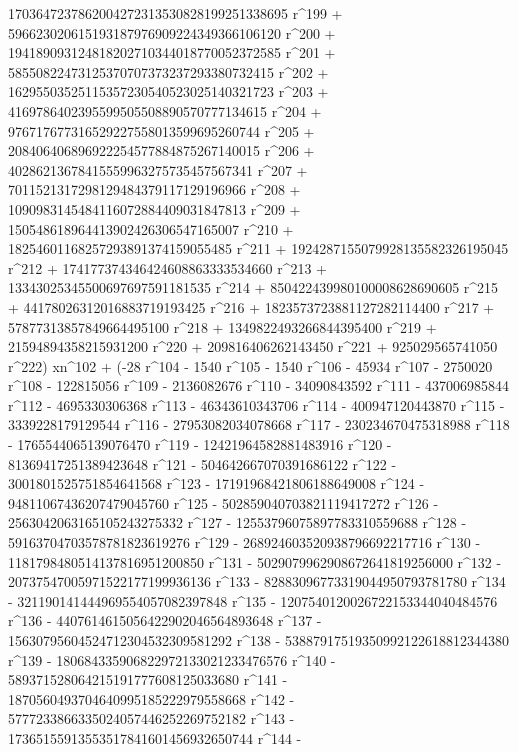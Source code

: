        1703647237862004272313530828199251338695 r^199 + 
       596623020615193187976909224349366106120 r^200 + 
       194189093124818202710344018770052372585 r^201 + 
       58550822473125370707373237293380732415 r^202 + 
       16295503525115357230540523025140321723 r^203 + 
       4169786402395599505508890570777134615 r^204 + 
       976717677316529227558013599695260744 r^205 + 
       208406406896922254577884875267140015 r^206 + 
       40286213678415559963275735457567341 r^207 + 
       7011521317298129484379117129196966 r^208 + 
       1090983145484116072884409031847813 r^209 + 
       150548618964413902426306547165007 r^210 + 
       18254601168257293891374159055485 r^211 + 
       1924287155079928135582326195045 r^212 + 
       174177374346424608863333534660 r^213 + 
       13343025345500697697591181535 r^214 + 
       850422439980100008628690605 r^215 + 
       44178026312016883719193425 r^216 + 
       1823573723881127282114400 r^217 + 
       57877313857849664495100 r^218 + 1349822493266844395400 r^219 + 
       21594894358215931200 r^220 + 209816406262143450 r^221 + 
       925029565741050 r^222) xn^102 + (-28 r^104 - 1540 r^105 - 
       1540 r^106 - 45934 r^107 - 2750020 r^108 - 122815056 r^109 - 
       2136082676 r^110 - 34090843592 r^111 - 437006985844 r^112 - 
       4695330306368 r^113 - 46343610343706 r^114 - 
       400947120443870 r^115 - 3339228179129544 r^116 - 
       27953082034078668 r^117 - 230234670475318988 r^118 - 
       1765544065139076470 r^119 - 12421964582881483916 r^120 - 
       81369417251389423648 r^121 - 504642667070391686122 r^122 - 
       3001801525751854641568 r^123 - 17191968421806188649008 r^124 - 
       94811067436207479045760 r^125 - 
       502859040703821119417272 r^126 - 
       2563042063165105243275332 r^127 - 
       12553796075897783310559688 r^128 - 
       59163704703578781823619276 r^129 - 
       268924603520938796692217716 r^130 - 
       1181798480514137816951200850 r^131 - 
       5029079962908672641819256000 r^132 - 
       20737547005971522177199936136 r^133 - 
       82883096773319044950793781780 r^134 - 
       321190141444969554057082397848 r^135 - 
       1207540120026722153344040484576 r^136 - 
       4407614615056422902046564893648 r^137 - 
       15630795604524712304532309581292 r^138 - 
       53887917519350992122618812344380 r^139 - 
       180684335906822972133021233476576 r^140 - 
       589371528064215191777608125033680 r^141 - 
       1870560493704640995185222979558668 r^142 - 
       5777233866335024057446252269752182 r^143 - 
       17365155913553517841601456932650744 r^144 - 
